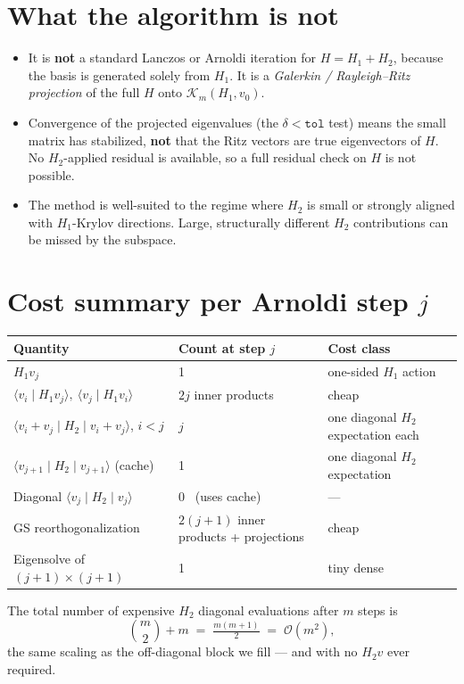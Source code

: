 \documentclass[11pt]{article}
\begin{document}
\section{What the algorithm is not}

\begin{itemize}
  \item It is \textbf{not} a standard Lanczos or Arnoldi iteration
        for $H = H_1 + H_2$, because the basis is generated solely
        from $H_1$.  It is a \emph{Galerkin / Rayleigh--Ritz projection}
        of the full $H$ onto $\mathcal{K}_m(H_1, v_0)$.
  \item Convergence of the projected eigenvalues (the
        $\delta < \texttt{tol}$ test) means the small matrix has
        stabilized, \textbf{not} that the Ritz vectors are true
        eigenvectors of $H$.  No $H_2$-applied residual is available,
        so a full residual check on $H$ is not possible.
  \item The method is well-suited to the regime where $H_2$ is small
        or strongly aligned with $H_1$-Krylov directions.  Large,
        structurally different $H_2$ contributions can be missed by
        the subspace.
\end{itemize}

\section{Cost summary per Arnoldi step $j$}

\begin{center}
\begin{tabular}{@{}lll@{}}
  \toprule
  Quantity & Count at step $j$ & Cost class \\
  \midrule
  $H_1 v_j$ &
    1 &
    one-sided $H_1$ action \\
  $\langle v_i \mid H_1 v_j\rangle,\ \langle v_j \mid H_1 v_i\rangle$ &
    $2j$ inner products &
    cheap \\
  $\langle v_i{+}v_j \mid H_2 \mid v_i{+}v_j\rangle$, $i < j$ &
    $j$ &
    one diagonal $H_2$ expectation each \\
  $\langle v_{j+1} \mid H_2 \mid v_{j+1}\rangle$ (cache) &
    1 &
    one diagonal $H_2$ expectation \\
  Diagonal $\langle v_j \mid H_2 \mid v_j\rangle$ &
    0 \ (uses cache) &
    --- \\
  GS reorthogonalization &
    $2(j{+}1)$ inner products + projections &
    cheap \\
  Eigensolve of $(j{+}1)\times(j{+}1)$ &
    1 &
    tiny dense \\
  \bottomrule
\end{tabular}
\end{center}

The total number of expensive $H_2$ diagonal evaluations after $m$
steps is
\begin{equation}
  \binom{m}{2} + m \;=\; \tfrac{m(m+1)}{2} \;=\; \mathcal{O}(m^2),
\end{equation}
the same scaling as the off-diagonal block we fill --- and with no
$H_2 v$ ever required.
\end{document}
